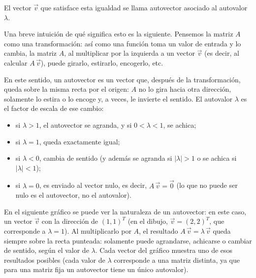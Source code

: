 \documentclass{article}
\newcommand{\vect}[1]{\vec{#1}}
\begin{document}
El vector \(\vect{v}\) que satisface esta igualdad se llama autovector asociado al autovalor \(\lambda\).

Una breve intuición de qué significa esto es la siguiente. Pensemos la matriz \(A\) como una transformación: así como una función toma un valor de entrada y lo cambia, la matriz \(A\), al multiplicar por la izquierda a un vector \(\vect{v}\) (es decir, al calcular \(A\,\vect{v}\)), puede girarlo, estirarlo, encogerlo, etc.

En este sentido, un autovector es un vector que, después de la transformación, queda sobre la misma recta por el origen: \(A\) no lo gira hacia otra dirección, solamente lo estira o lo encoge y, a veces, le invierte el sentido. El autovalor \(\lambda\) es el factor de escala de ese cambio:
\begin{itemize}
  \item si \(\lambda>1\), el autovector se agranda, y si \(0<\lambda<1\), se achica;
  \item si \(\lambda=1\), queda exactamente igual;
  \item si \(\lambda<0\), cambia de sentido (y además se agranda si \(|\lambda|>1\) o se achica si \(|\lambda|<1\));
  \item si \(\lambda=0\), es enviado al vector nulo, es decir, \(A\,\vect{v}=\vect{0}\) (lo que no puede ser nulo es el autovector, no el autovalor).
\end{itemize}

En el siguiente gráfico se puede ver la naturaleza de un autovector: en este caso, un vector \(\vect{v}\) con la dirección de \((1,1)^T\) (en el dibujo, \(\vect{v}=(2,2)^T\), que corresponde a \(\lambda=1\)). Al multiplicarlo por \(A\), el resultado \(A\,\vect{v}=\lambda\,\vect{v}\) queda siempre sobre la recta punteada: solamente puede agrandarse, achicarse o cambiar de sentido, según el valor de \(\lambda\). Cada vector del gráfico muestra uno de esos resultados posibles (cada valor de \(\lambda\) corresponde a una matriz distinta, ya que para una matriz fija un autovector tiene un único autovalor).
\end{document}
